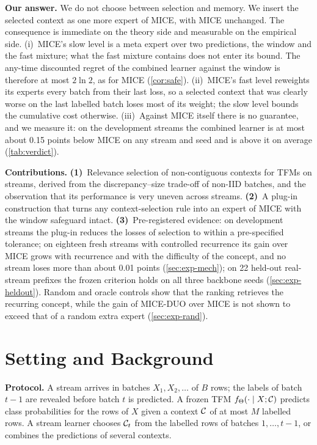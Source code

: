 \documentclass{article}
\theoremstyle{plain}
\theoremstyle{definition}
\theoremstyle{remark}
\newcommand{\mice}{\textsc{MICE}}
\newcommand{\method}{\textsc{MICE-DUO}}
\begin{document}
\textbf{Our answer.} We do not choose between selection and memory. We insert the selected context as one more
expert of \mice{}, with \mice{} unchanged. The consequence is immediate on the theory side and measurable on the
empirical side.
(i)~\mice{}'s slow level is a meta expert over two predictions, the window and the fast mixture; what the fast
mixture contains does not enter its bound. The any-time discounted regret of the combined learner against the window
is therefore at most $2\ln 2$, as for \mice{} (\cref{cor:safe}).
(ii)~\mice{}'s fast level reweights its experts every batch from their last loss, so a selected context that was clearly
worse on the last labelled batch loses most of its weight; the slow level bounds the cumulative cost otherwise.
(iii)~Against \mice{} itself there is no guarantee, and we measure it: on the development streams the combined
learner is at most about 0.15 points below \mice{} on any stream and seed and is above it on average
(\cref{tab:verdict}).

\textbf{Contributions.}
\textbf{(1)}~Relevance selection of non-contiguous contexts for TFMs on streams, derived from the discrepancy--size
trade-off of non-IID batches, and the observation that its performance is very uneven across streams.
\textbf{(2)}~A plug-in construction that turns any context-selection rule into an expert of \mice{} with the
window safeguard intact.
\textbf{(3)}~Pre-registered evidence: on development streams the plug-in reduces the losses of selection to within a
pre-specified tolerance; on
eighteen fresh streams with controlled recurrence its gain over \mice{} grows with recurrence and with the difficulty
of the concept, and no stream loses more than about 0.01 points (\cref{sec:exp-mech}); on 22 held-out real-stream prefixes the
frozen criterion holds on all three backbone seeds (\cref{sec:exp-heldout}). Random and oracle controls show that the
ranking retrieves the recurring concept, while the gain of \method{} over \mice{} is not shown to exceed that of a
random extra expert (\cref{sec:exp-rand}).

\section{Setting and Background}
\label{sec:setting}

\textbf{Protocol.} A stream arrives in batches $X_1,X_2,\dots$ of $B$ rows; the labels of batch $t-1$ are revealed
before batch $t$ is predicted. A frozen TFM $f_\Theta(\cdot\mid X;\mathcal{C})$ predicts class probabilities for the rows of
$X$ given a context $\mathcal{C}$ of at most $M$ labelled rows. A stream learner chooses $\mathcal{C}_t$ from the labelled rows of
batches $1,\dots,t-1$, or combines the predictions of several contexts.
\end{document}
